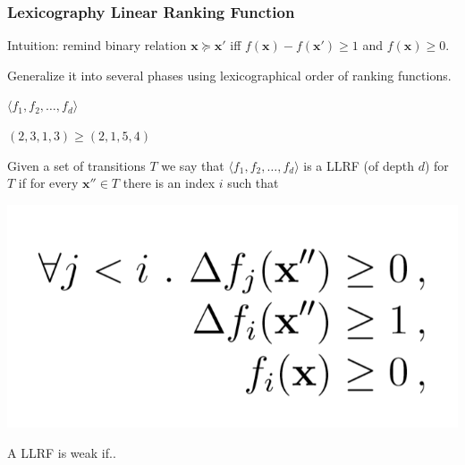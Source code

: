 \documentclass[11pt]{beamer}
\begin{document}
\begin{frame}\frametitle{Lexicography Linear Ranking Function}

Intuition: remind binary relation $\textbf{x} \succeq \textbf{x}'$ iff  $f(\textbf{x}) - f(\textbf{x}') \ge 1$ and $f(\textbf{x}) \ge 0$.

Generalize it into several phases using lexicographical order of ranking functions.

$\langle f_1, f_2, \ldots, f_d\rangle$

$(2,3,1,3) \ge (2,1,5,4)$

\begin{definition}[LLRF]
Given a set of transitions $T$ we say that 
$\langle f_1, f_2, \ldots, f_d\rangle$ is a LLRF (of depth $d$) for $T$ if for every $\textbf{x}''\in T$ there is an index $i$ such that 
\begin{center}
\includegraphics[scale = 0.26]{4.png}

\end{center}
A LLRF is weak if..
\end{definition}
\end{frame}
\end{document}
